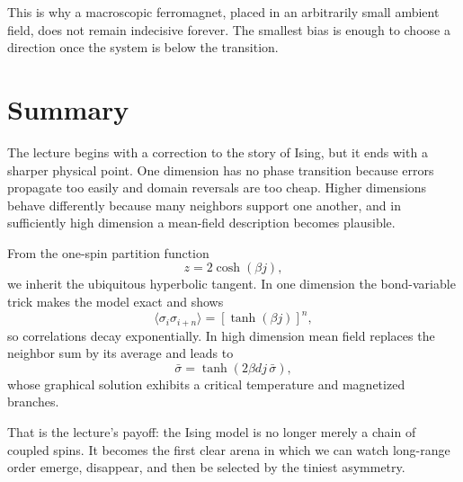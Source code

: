 This is why a macroscopic ferromagnet, placed in an arbitrarily small ambient field, does not remain indecisive forever. The smallest bias is enough to choose a direction once the system is below the transition.

\section{Summary}

The lecture begins with a correction to the story of Ising, but it ends with a sharper physical point. One dimension has no phase transition because errors propagate too easily and domain reversals are too cheap. Higher dimensions behave differently because many neighbors support one another, and in sufficiently high dimension a mean-field description becomes plausible.

From the one-spin partition function
\begin{equation}
z=2\cosh(\beta j),
\end{equation}
we inherit the ubiquitous hyperbolic tangent. In one dimension the bond-variable trick makes the model exact and shows
\begin{equation}
\langle \sigma_i \sigma_{i+n}\rangle=[\tanh(\beta j)]^n,
\end{equation}
so correlations decay exponentially. In high dimension mean field replaces the neighbor sum by its average and leads to
\begin{equation}
\bar{\sigma}=\tanh(2\beta d j\,\bar{\sigma}),
\end{equation}
whose graphical solution exhibits a critical temperature and magnetized branches.

That is the lecture's payoff: the Ising model is no longer merely a chain of coupled spins. It becomes the first clear arena in which we can watch long-range order emerge, disappear, and then be selected by the tiniest asymmetry.